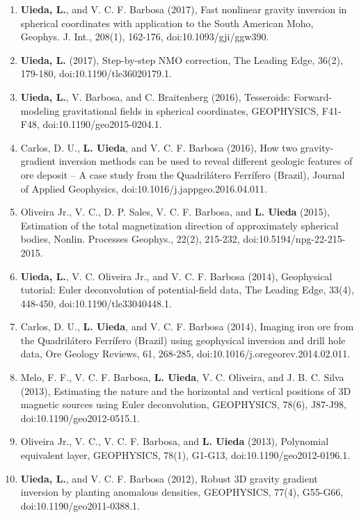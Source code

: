 \begin{enumerate}
\item \textbf{Uieda, L.}, and V. C. F. Barbosa (2017), Fast nonlinear gravity inversion in spherical coordinates with application to the South American Moho, Geophys. J. Int., 208(1), 162-176, doi:10.1093/gji/ggw390.
\item \textbf{Uieda, L.} (2017), Step-by-step NMO correction, The Leading Edge, 36(2), 179-180, doi:10.1190/tle36020179.1.
\item \textbf{Uieda, L.}, V. Barbosa, and C. Braitenberg (2016), Tesseroids: Forward-modeling gravitational fields in spherical coordinates, GEOPHYSICS, F41-F48, doi:10.1190/geo2015-0204.1.
\item Carlos, D. U., \textbf{L. Uieda}, and V. C. F. Barbosa (2016), How two gravity-gradient inversion methods can be used to reveal different geologic features of ore deposit -- A case study from the Quadrilátero Ferrífero (Brazil), Journal of Applied Geophysics, doi:10.1016/j.jappgeo.2016.04.011.
\item Oliveira Jr., V. C., D. P. Sales, V. C. F. Barbosa, and \textbf{L. Uieda} (2015), Estimation of the total magnetization direction of approximately spherical bodies, Nonlin. Processes Geophys., 22(2), 215-232, doi:10.5194/npg-22-215-2015.
\item \textbf{Uieda, L.}, V. C. Oliveira Jr., and V. C. F. Barbosa (2014), Geophysical tutorial: Euler deconvolution of potential-field data, The Leading Edge, 33(4), 448-450, doi:10.1190/tle33040448.1.
\item Carlos, D. U., \textbf{L. Uieda}, and V. C. F. Barbosa (2014), Imaging iron ore from the Quadrilátero Ferrífero (Brazil) using geophysical inversion and drill hole data, Ore Geology Reviews, 61, 268-285, doi:10.1016/j.oregeorev.2014.02.011.
\item Melo, F. F., V. C. F. Barbosa, \textbf{L. Uieda}, V. C. Oliveira, and J. B. C. Silva (2013), Estimating the nature and the horizontal and vertical positions of 3D magnetic sources using Euler deconvolution, GEOPHYSICS, 78(6), J87-J98, doi:10.1190/geo2012-0515.1.
\item Oliveira Jr., V. C., V. C. F. Barbosa, and \textbf{L. Uieda} (2013), Polynomial equivalent layer, GEOPHYSICS, 78(1), G1-G13, doi:10.1190/geo2012-0196.1.
\item \textbf{Uieda, L.}, and V. C. F. Barbosa (2012), Robust 3D gravity gradient inversion by planting anomalous densities, GEOPHYSICS, 77(4), G55-G66, doi:10.1190/geo2011-0388.1.
\end{enumerate}

